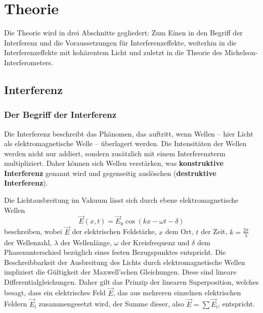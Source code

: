 \section{Theorie}
\label{sec:Theorie}

Die Theorie wird in drei Abschnitte gegliedert: Zum Einen in den Begriff der Interferenz und
die Voraussetzungen für Interferenzeffekte, weiterhin in die Interferenzeffekte mit
kohärentem Licht und zuletzt in die Theorie des Michelson-Interferometers.


\subsection{Interferenz}
\label{sec:interferenz}

\subsubsection{Der Begriff der Interferenz}
\label{sec:interferenzdef}
Die Interferenz beschreibt das Phänomen, das auftritt, wenn Wellen -- hier Licht als
elektromagnetische Welle -- überlagert werden.
Die Intensitäten der Wellen werden nicht nur addiert, sondern zusätzlich mit einem
Interferenzterm multipliziert. Daher können sich Wellen verstärken, was \textbf{konstruktive
Interferenz} genannt wird und gegenseitig auslöschen (\textbf{destruktive Interferenz}).

Die Lichtausbreitung im Vakuum lässt sich durch ebene elektromagnetische Wellen
\begin{equation}
	\label{eqn:ebenewelle}
	\vec{E}(x,t) = \vec{E}_0 \cos(k x - \omega t - \delta)
\end{equation}
beschreiben, wobei $\vec{E}$ der elektrischen Feldstärke, $x$ dem Ort, $t$ der Zeit, $k=\frac{2\pi}{\lambda}$ der Wellenzahl, $\lambda$
der Wellenlänge, $\omega$ der Kreisfrequenz und $\delta$ dem Phasenunterschied bezüglich eines
festen Bezugspunktes entspricht.
Die Beschreibbarkeit der Ausbreitung des Lichts durch elektromagnetische Wellen impliziert die
Gültigkeit der Maxwell'schen Gleichungen. Diese sind lineare Differentialgleichungen. Daher
gilt das Prinzip der linearen Superposition, welches besagt, dass ein elektrisches Feld
$\vec{E}$, das aus mehreren einzelnen elektrischen Feldern $\vec{E}_{\mathrm{i}}$
zusammengesetzt wird, der Summe dieser, also $\vec{E} = \sum \vec{E}_{\mathrm{i}}$, entspricht.

